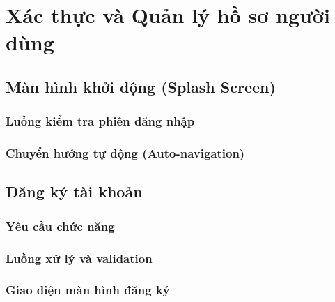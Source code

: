 
\chapter{Xác thực và Quản lý hồ sơ người dùng}

\section{Màn hình khởi động (Splash Screen)}

\subsection{Luồng kiểm tra phiên đăng nhập}


\subsection{Chuyển hướng tự động (Auto-navigation)}


\section{Đăng ký tài khoản}

\subsection{Yêu cầu chức năng}


\subsection{Luồng xử lý và validation}


\subsection{Giao diện màn hình đăng ký}


